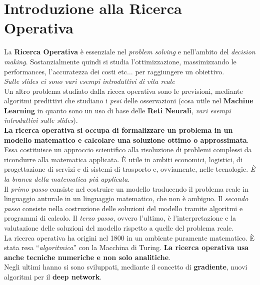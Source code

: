 \message{ !name(ro.tex)}\documentclass[a4paper,12pt, oneside]{book}
\begin{document}
\chapter{Introduzione alla Ricerca Operativa}
La\textbf{ Ricerca Operativa} è essenziale nel \textit{problem
  solving} e nell'ambito del \textit{decision making}.
Sostanzialmente quindi si studia l'ottimizzazione, massimizzando le
performances, l'accuratezza dei costi etc$\ldots$ per raggiungere un
obiettivo. \\ \textit{Sulle slides ci sono vari esempi introduttivi di
  vita reale}\\
Un altro problema studiato dalla riceca operativa sono le previsioni,
mediante algoritmi predittivi che studiano i \textit{pesi} delle
osservazioni (cosa utile nel \textbf{Machine Learning} in quanto sono
un uso di base delle \textbf{Reti Neurali}, \textit{vari esempi
  introduttivi sulle slides}).\\
\textbf{La ricerca operativa si occupa di formalizzare un problema in
  un modello matematico e calcolare una soluzione ottimo o
  approssimata}. Essa costituisce un approccio scientifico alla
risoluzione di problemi complessi da ricondurre alla matematica
applicata. È utile in ambiti economici, logistici, di progettazione di
servizi e di sistemi di trasporto e, ovviamente, nelle tecnologie.
\textit{È la branca della matematica più applicata}.\\
Il \textit{primo passo} consiste nel costruire un modello traducendo il
problema reale in linguaggio anturale in un linguaggio matematico, che
non è ambiguo. Il \textit{secondo passo} consiste nella costruzione delle
soluzioni del modello tramite algoritmi e programmi di calcolo. Il
\textit{terzo passo}, ovvero l'ultimo, è l'interpretazione e la
valutazione delle soluzioni del modello rispetto a quelle del problema
reale.\\
La ricerca operativa ha origini nel 1800 in un ambiente puramente
matematico. È stata resa ``\textit{algoritmica}'' con la Macchina di
Turing. \textbf{La ricerca operativa usa anche tecniche numeriche e
  non solo analitiche}.\\
Negli ultimi hanno si sono sviluppati, mediante il concetto di
\textbf{gradiente}, nuovi algoritmi per il \textbf{deep network}.\\
\end{document}
